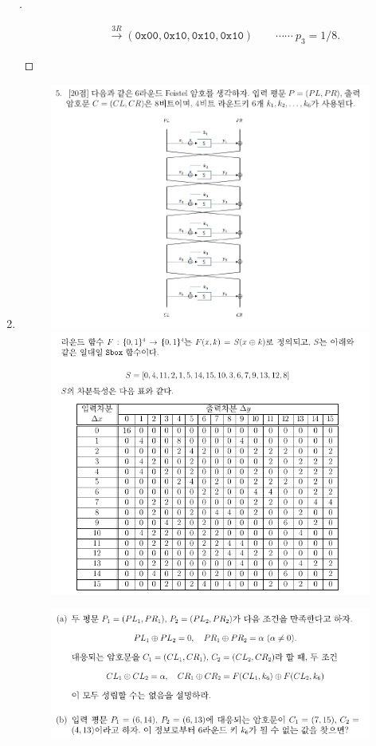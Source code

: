 \begin{enumerate}[\bf 1.]
\begin{proof}[\sol]
\begin{enumerate}[(a)]
\begin{align*}
		&\xrightarrow{3R}(\texttt{0x00},\texttt{0x10},\texttt{0x10},\texttt{0x10})\quad\quad\cdots\cdots\ p_3=1/8.
	\end{align*}
		\end{enumerate}
	\end{proof}
	\newpage
	\item[]
	\begin{figure}[h!]\centering
	\includegraphics[scale=.45]{final2023-5}
	\includegraphics[scale=.55]{final2023-5-2}
	\end{figure}	
	\begin{figure}[h!]\centering
		\includegraphics[scale=.55]{final2023-5-3}

\end{figure}
\end{enumerate}
